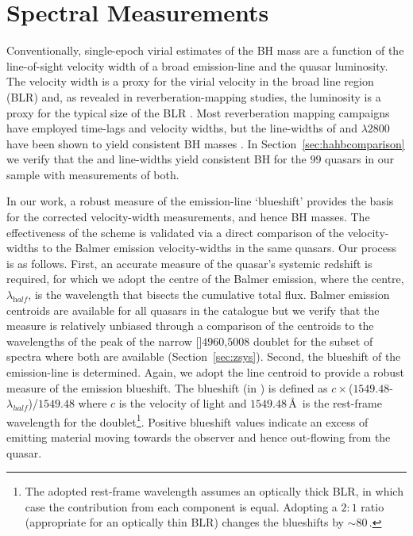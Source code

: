 \section{Spectral Measurements}
\label{sec:spec_measures}

Conventionally, single-epoch virial estimates of the BH mass are a function of the line-of-sight velocity width of a broad emission-line and the quasar luminosity. 
The velocity width is a proxy for the virial velocity in the broad line region (BLR) and, as revealed in reverberation-mapping studies, the luminosity is a proxy for the typical size of the BLR \citep[the $R-L$ relation; e.g.][]{kaspi00,kaspi07}. 
Most reverberation mapping campaigns have employed \hb time-lags and velocity widths, but the line-widths of \ha and $\lambda$$2800$ have been shown to yield consistent BH masses \citep[e.g.][]{mclure02,greene05b,onken08,shen08,wang09,rafiee11,mejia-restrepo16}. 
In Section~\ref{sec:hahbcomparison} we verify that the \ha and \hb line-widths yield consistent BH for the $99$ quasars in our sample with measurements of both.     

In our work, a robust measure of the  emission-line `blueshift' provides the basis for the corrected  velocity-width measurements, and hence BH masses.
The effectiveness of the scheme is validated via a direct comparison of the  velocity-widths to the Balmer emission velocity-widths in the same quasars. 
Our process is as follows. 
First, an accurate measure of the quasar's systemic redshift is required, for which we adopt the centre of the Balmer emission, where the centre, $\lambda_{\mathrm half}$, is the wavelength that bisects the cumulative total flux. 
Balmer emission centroids are available for all quasars in the catalogue but we verify that the measure is relatively unbiased through a comparison of the centroids to the wavelengths of the peak of the narrow []\ll$4960$,$5008$ doublet for the subset of spectra where both are available (Section~\ref{sec:zsys}). 
Second, the blueshift of the  emission-line is determined. 
Again, we adopt the line centroid to provide a robust measure of the  emission blueshift.
The blueshift (in \kms) is defined as $c\times$($1549.48$-$\lambda_{half}$)/$1549.48$ where $c$ is the velocity of light and $1549.48$\,\AA\, is the rest-frame wavelength for the  doublet\footnote{The adopted  rest-frame wavelength assumes an optically thick BLR, in which case the contribution from each component is equal. Adopting a $2:1$ ratio (appropriate for an optically thin BLR) changes the blueshifts by $\sim80$\,\kms.}. 
Positive blueshift values indicate an excess of emitting material moving towards the observer and hence out-flowing from the quasar. 

